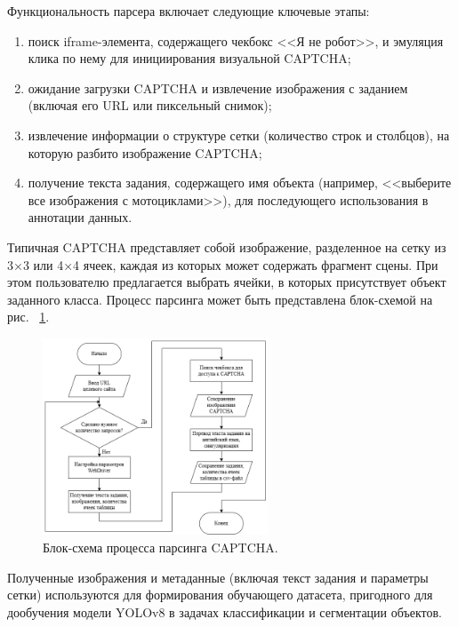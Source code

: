 Функциональность парсера включает следующие ключевые этапы:

\begin{enumerate}
    \item поиск iframe-элемента, содержащего чекбокс <<Я не робот>>, и эмуляция 
    клика по нему для инициирования визуальной CAPTCHA;
    \item ожидание загрузки CAPTCHA и извлечение изображения с заданием (включая 
    его URL или пиксельный снимок);
    \item извлечение информации о структуре сетки (количество строк и столбцов), 
    на которую разбито изображение CAPTCHA;
    \item получение текста задания, содержащего имя объекта (например, <<выберите 
    все изображения с мотоциклами>>), для последующего использования в аннотации 
    данных.
\end{enumerate}

Типичная CAPTCHA представляет собой изображение, разделенное на сетку из 3×3 или 
4×4 ячеек, каждая из которых может содержать фрагмент сцены. При этом 
пользователю предлагается выбрать ячейки, в которых присутствует объект заданного 
класса. Процесс парсинга может быть представлена блок-схемой на рис.~
\ref{fig:captcha-flow}.

\begin{figure}[H]
    \centering
    \includegraphics[width=0.6\textwidth]{
        imgs/imagecaptcha/image_captcha_flow.png
    }
    \caption{Блок-схема процесса парсинга CAPTCHA.}
    \label{fig:captcha-flow}
\end{figure}
\vspace{-0.5cm}

Полученные изображения и метаданные (включая текст задания и параметры сетки) 
используются для формирования обучающего датасета, пригодного для дообучения 
модели YOLOv8 в задачах классификации и сегментации объектов.

